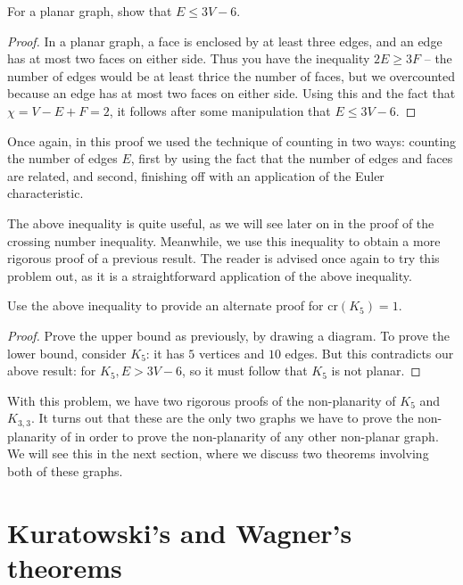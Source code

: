 \documentclass[11pt,paper=letter]{scrartcl}
\newcommand{\crs}[1]{\mathrm{cr}(#1)}
\begin{document}
\begin{problem}
For a planar graph, show that $E \leq 3V - 6$.
\end{problem}

\begin{proof}
In a planar graph, a face is enclosed by at least three edges, and an edge has at most two faces on either side. Thus you have the inequality $2E \geq 3F$ -- the number of edges would be at least thrice the number of faces, but we overcounted because an edge has at most two faces on either side. Using this and the fact that $\chi = V - E + F = 2$, it follows after some manipulation that $E \leq 3V - 6$.
\end{proof}

Once again, in this proof we used the technique of counting in two ways: counting the number of edges $E$, first by using the fact that the number of edges and faces are related, and second, finishing off with an application of the Euler characteristic.

The above inequality is quite useful, as we will see later on in the proof of the crossing number inequality. Meanwhile, we use this inequality to obtain a more rigorous proof of a previous result. The reader is advised once again to try this problem out, as it is a straightforward application of the above inequality.

\begin{problem}
Use the above inequality to provide an alternate proof for $\crs{K_5} = 1$.
\end{problem}

\begin{proof}
Prove the upper bound as previously, by drawing a diagram. To prove the lower bound, consider $K_5$: it has $5$ vertices and $10$ edges. But this contradicts our above result: for $K_5, E > 3V - 6$, so it must follow that $K_5$ is not planar.
\end{proof}

With this problem, we have two rigorous proofs of the non-planarity of $K_5$ and $K_{3,3}$. It turns out that these are the only two graphs we have to prove the non-planarity of in order to prove the non-planarity of any other non-planar graph. We will see this in the next section, where we discuss two theorems involving both of these graphs. 

\section{Kuratowski's and Wagner's theorems}
\end{document}
